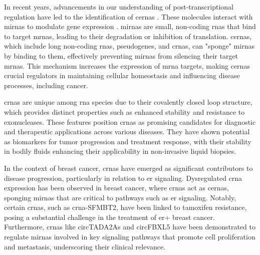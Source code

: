 In recent years, advancements in our understanding of post-transcriptional
regulation have led to the identification of \glspl{cerna}
\supercite{salmena_cerna_2011,tay_multilayered_2014}.
These molecules interact with \glspl{mirna} to modulate gene expression
\supercite{salmena_cerna_2011,li_long_2017}.
\glspl{mirna} are small, non-coding \glspl{rna} that bind to target
\glspl{mrna},
leading to their degradation or inhibition of
translation\supercite{salmena_cerna_2011,tay_multilayered_2014}.
\Glspl{cerna}, which include long non-coding \glspl{rna}, pseudogenes, and
\glspl{crna}, can
"sponge" \glspl{mirna} by binding to them, effectively preventing \glspl{mirna}
from silencing their target
\glspl{mrna}\supercite{salmena_cerna_2011,poliseno_coding-independent_2010}.
This mechanism increases the expression of \gls{mrna} targets, making
\glspl{cerna} crucial regulators in maintaining cellular homeostasis and
influencing disease processes, including
cancer\supercite{salmena_cerna_2011,vo_landscape_2019}.

\Glspl{crna} are unique among \gls{rna} species due to their covalently closed
loop
structure, which provides distinct properties such as enhanced stability and
resistance to exonucleases\supercite{vo_landscape_2019}.
These features position \glspl{crna} as promising candidates for diagnostic and
therapeutic applications across various
diseases\supercite{ma_circular_2020,hoque_exploring_2023,wilusz_circular_2017}.
They have shown potential as biomarkers for tumor progression and treatment
response\supercite{bao_prognostic_2020,ren_construction_2017}, with their
stability in bodily fluids enhancing their applicability in non-invasive liquid
biopsies\supercite{bao_prognostic_2020,zhang_circular_2018}.

In the context of breast cancer, \glspl{crna} have emerged as significant
contributors to disease progression, particularly in relation to \gls{er} signaling.
Dysregulated \gls{crna} expression has been observed in breast cancer, where
\glspl{crna} act as \glspl{cerna}, sponging \glspl{mirna} that are critical to
pathways such as \gls{er} signaling\supercite{nair_circular_2016,xu_circrna_2022}.
Notably, certain \glspl{crna}, such as \gls{crna}-SFMBT2, have been linked to
tamoxifen resistance, posing a substantial challenge in the treatment of
\gls{er+} breast cancer\supercite{li_circrna-sfmbt2_2023}.
Furthermore, \glspl{crna} like circTADA2As and circFBXL5 have been demonstrated
to regulate \glspl{mirna} involved in key signaling pathways that promote cell
proliferation and metastasis, underscoring their clinical
relevance\supercite{xu_circtada2as_2019,gao_hsa_circrna_0006528_2019}.

